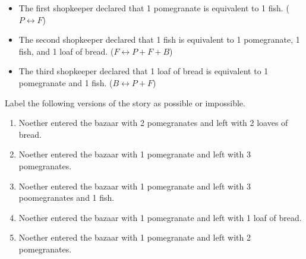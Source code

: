 \begin{itemize}
\item The first shopkeeper declared that 1 pomegranate is equivalent to 1 fish. (\(P \leftrightarrow F\))
\item The second shopkeeper declared that 1 fish is equivalent to 1 pomegranate, 1 fish, and 1 loaf of bread. (\(F \leftrightarrow P + F + B\))
\item The third shopkeeper declared that 1 loaf of bread is equivalent to 1 pomegranate and 1 fish. (\(B \leftrightarrow P + F\))
\end{itemize}

Label the following versions of the story as possible or impossible.
\begin{enumerate}
\item Noether entered the bazaar with 2 pomegranates and left with 2 loaves of bread.
\item Noether entered the bazaar with 1 pomegranate and left with 3 pomegranates.
\item Noether entered the bazaar with 1 pomegranate and left with 3 poomegranates and 1 fish.
\item Noether entered the bazaar with 1 pomegranate and left with 1 loaf of bread.
\item Noether entered the bazaar with 1 pomegranate and left with 2 pomegranates.
\end{enumerate}
